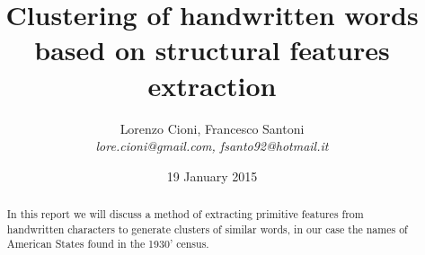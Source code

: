 \documentclass[a4paper,12pt]{article}
\title{\bf Clustering of handwritten words based on structural features extraction}
\date {19 January 2015}
\author{Lorenzo Cioni, Francesco Santoni\\\textit{{\small lore.cioni@gmail.com, fsanto92@hotmail.it}}}
\begin{document}
\maketitle

\begin{abstract}
In this report we will discuss a method of extracting primitive features from handwritten characters to generate clusters of similar words, in our case the names of American States found in the 1930' census.
\end{abstract}

\tableofcontents










\end{document}
